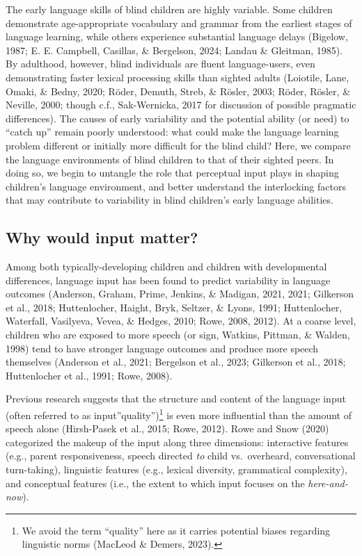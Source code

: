 \documentclass[
  man,floatsintext]{apa6}
\begin{document}
The early language skills of blind children are highly variable. Some children demonstrate age-appropriate vocabulary and grammar from the earliest stages of language learning, while others experience substantial language delays (Bigelow, 1987; E. E. Campbell, Casillas, \& Bergelson, 2024; Landau \& Gleitman, 1985). By adulthood, however, blind individuals are fluent language-users, even demonstrating faster lexical processing skills than sighted adults (Loiotile, Lane, Omaki, \& Bedny, 2020; Röder, Demuth, Streb, \& Rösler, 2003; Röder, Rösler, \& Neville, 2000; though c.f., Sak-Wernicka, 2017 for discussion of possible pragmatic differences). The causes of early variability and the potential ability (or need) to ``catch up'' remain poorly understood: what could make the language learning problem different or initially more difficult for the blind child? Here, we compare the language environments of blind children to that of their sighted peers. In doing so, we begin to untangle the role that perceptual input plays in shaping children's language environment, and better understand the interlocking factors that may contribute to variability in blind children's early language abilities.

\hypertarget{why-would-input-matter}{%
\subsection{Why would input matter?}\label{why-would-input-matter}}

Among both typically-developing children and children with developmental differences, language input has been found to predict variability in language outcomes (Anderson, Graham, Prime, Jenkins, \& Madigan, 2021, 2021; Gilkerson et al., 2018; Huttenlocher, Haight, Bryk, Seltzer, \& Lyons, 1991; Huttenlocher, Waterfall, Vasilyeva, Vevea, \& Hedges, 2010; Rowe, 2008, 2012). At a coarse level, children who are exposed to more speech (or sign, Watkins, Pittman, \& Walden, 1998) tend to have stronger language outcomes and produce more speech themselves (Anderson et al., 2021; Bergelson et al., 2023; Gilkerson et al., 2018; Huttenlocher et al., 1991; Rowe, 2008).

Previous research suggests that the structure and content of the language input (often referred to as input''quality'')\footnote{We avoid the term ``quality'' here as it carries potential biases regarding linguistic norms (MacLeod \& Demers, 2023).} is even more influential than the amount of speech alone (Hirsh-Pasek et al., 2015; Rowe, 2012). Rowe and Snow (2020) categorized the makeup of the input along three dimensions: interactive features (e.g., parent responsiveness, speech directed \emph{to} child vs.~overheard, conversational turn-taking), linguistic features (e.g., lexical diversity, grammatical complexity), and conceptual features (i.e., the extent to which input focuses on the \emph{here-and-now}).
\end{document}
